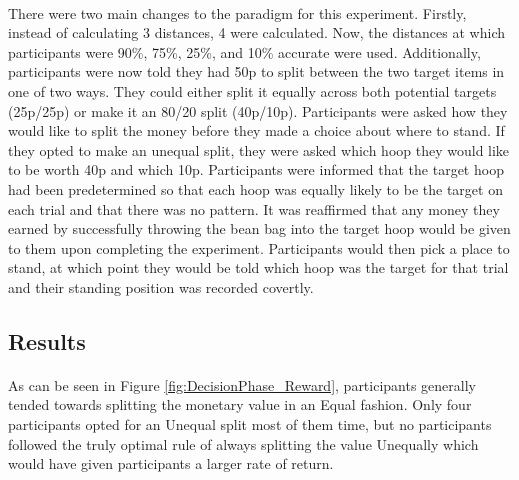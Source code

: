 \documentclass[12pt]{article}
\begin{document}
\paragraph{} There were two main changes to the paradigm for this experiment. Firstly, instead of calculating 3 distances, 4 were calculated. Now, the distances at which participants were 90\%, 75\%, 25\%, and 10\% accurate were used. Additionally, participants were now told they had 50p to split between the two target items in one of two ways. They could either split it equally across both potential targets (25p/25p) or make it an 80/20 split (40p/10p). Participants were asked how they would like to split the money before they made a choice about where to stand. If they opted to make an unequal split, they were asked which hoop they would like to be worth 40p and which 10p. Participants were informed that the target hoop had been predetermined so that each hoop was equally likely to be the target on each trial and that there was no pattern. It was reaffirmed that any money they earned by successfully throwing the bean bag into the target hoop would be given to them upon completing the experiment. Participants would then pick a place to stand, at which point they would be told which hoop was the target for that trial and their standing position was recorded covertly. 


\subsection*{Results}

\paragraph{} As can be seen in Figure \ref{fig:DecisionPhase_Reward}, participants generally tended towards splitting the monetary value in an Equal fashion. Only four participants opted for an Unequal split most of them time, but no participants followed the truly optimal rule of always splitting the value Unequally which would have given participants a larger rate of return. 
\end{document}
